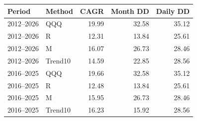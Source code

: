 \begin{tabular}{@{}llrrr@{}}\toprule
Period & Method & CAGR & Month DD & Daily DD\\\midrule
2012--2026 & QQQ & 19.99 & 32.58 & 35.12\\
2012--2026 & R & 12.31 & 13.84 & 25.61\\
2012--2026 & M & 16.07 & 26.73 & 28.46\\
2012--2026 & Trend10 & 14.59 & 22.85 & 28.56\\
2016--2025 & QQQ & 19.66 & 32.58 & 35.12\\
2016--2025 & R & 12.48 & 13.84 & 25.61\\
2016--2025 & M & 15.95 & 26.73 & 28.46\\
2016--2025 & Trend10 & 16.23 & 15.92 & 28.56\\
\bottomrule\end{tabular}
